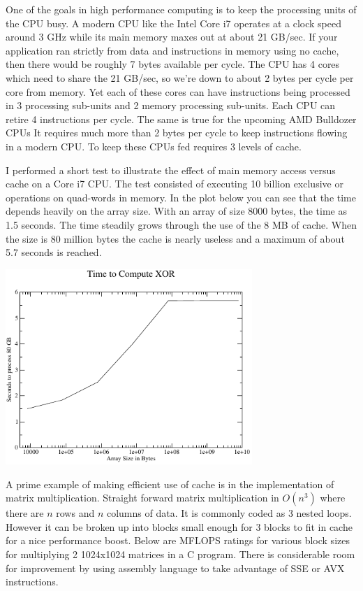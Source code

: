 \documentclass[11pt,b5paper]{book}
\begin{document}
One of the goals in high performance computing is to keep the processing units
of the CPU busy.
A modern CPU like the Intel Core i7 operates at a clock speed around 3 GHz while
its main memory maxes out at about 21 GB/sec.
If your application ran strictly from data and instructions in memory using no
cache, then there would be roughly 7 bytes available per cycle.
The CPU has 4 cores which need to share the 21 GB/sec, so we're down to about 2
bytes per cycle per core from memory.
Yet each of these cores can have instructions being processed in 3 processing sub-units and 2 memory processing sub-units.
Each CPU can retire 4 instructions per cycle.
The same is true for the upcoming AMD Bulldozer CPUs
It requires much more than 2 bytes per cycle to keep instructions flowing in
a modern CPU.
To keep these CPUs fed requires 3 levels of cache.

I performed a short test to illustrate the effect of main memory access versus
cache on a Core i7 CPU.
The test consisted of executing 10 billion exclusive or operations on quad-words
in memory.
In the plot below you can see that the time depends heavily on the array size.
With an array of size 8000 bytes, the time as 1.5 seconds.
The time steadily grows through the use of the 8 MB of cache.
When the size is 80 million bytes the cache is nearly useless and a maximum of
about 5.7 seconds is reached.

\begin{center}
\includegraphics[width=0.7\textwidth]{xor.pdf}
\end{center}

A prime example of making efficient use of cache is in the implementation
of matrix multiplication.
Straight forward matrix multiplication in $O(n^3)$ where there are $n$ rows and
$n$ columns of data.
It is commonly coded as 3 nested loops.
However it can be broken up into blocks small enough for 3 blocks to fit in
cache for a nice performance boost.
Below are MFLOPS ratings for various block sizes for multiplying 2 1024x1024 
matrices in a C program.
There is considerable room for improvement by using assembly language to
take advantage of SSE or AVX instructions.
\end{document}
